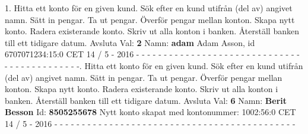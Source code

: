 1.   Hitta ett konto för en given kund.   Sök efter en kund utifrån (del av) angivet namn.   Sätt in pengar.   Ta ut pengar.   Överför pengar mellan konton.   Skapa nytt konto.   Radera existerande konto.   Skriv ut alla konton i banken.   Återställ banken till ett tidigare datum. Avsluta\newline
Val: \textbf{2}\newline
Namn: \textbf{adam}\newline
Adam Asson, id 6707071234:15:0 CET 14 / 5 - 2016\newline
\newline
- - - - - - - - - - - - - - - - - - - - - - - - - - - - - - - - - - - - - - - - - - - -.   Hitta ett konto för en given kund.   Sök efter en kund utifrån (del av) angivet namn.   Sätt in pengar.   Ta ut pengar.   Överför pengar mellan konton.   Skapa nytt konto.   Radera existerande konto.   Skriv ut alla konton i banken.   Återställ banken till ett tidigare datum. Avsluta\newline
Val: \textbf{6}\newline
Namn: \textbf{Berit Besson}\newline
Id: \textbf{8505255678}\newline
Nytt konto skapat med kontonummer: 1002:56:0 CET 14 / 5 - 2016\newline
\newline
- - - - - - - - - - - - - - - - - - - - - - - - - - - - - - - - - - - - - - - - - - - -\newline
